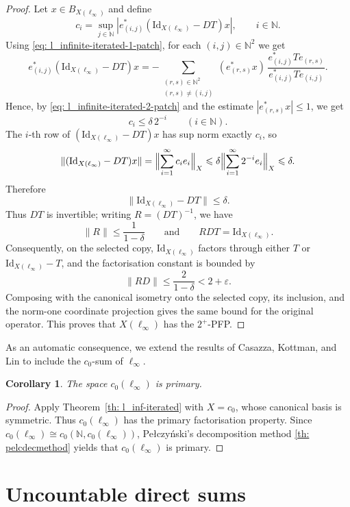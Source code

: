 \documentclass[11pt]{amsart}
\theoremstyle{plain}
\newtheorem{corollary}[theorem]{Corollary}
\theoremstyle{definition}
\numberwithin{equation}{section}
\newcommand{\norm}[1]{\lVert #1 \rVert}
\newcommand{\N}{\mathbb{N}}
\newcommand{\Id}{\mathrm{Id}}
\renewcommand{\le}{\leqslant}
\renewcommand{\leq}{\leqslant}
\begin{document}
\begin{proof}
    Let $x\in B_{X(\ell_\infty)}$ and define
    \[
    c_i=\sup_{j\in\N}|e^*_{(i,j)}(\Id_{X(\ell_\infty)}-DT)x|,
    \qquad i\in\N.
    \]
    Using \eqref{eq: l_infinite-iterated-1-patch}, for each $(i,j)\in\N^2$ we get
    \[
    e^*_{(i,j)}(\Id_{X(\ell_\infty)}-DT)x
    = -\sum_{\substack{(r,s)\in\N^2\\(r,s)\neq(i,j)}}
    (e^*_{(r,s)}x)\,\frac{e^*_{(i,j)}Te_{(r,s)}}{e^*_{(i,j)}Te_{(i,j)}}.
    \]
    Hence, by \eqref{eq: l_infinite-iterated-2-patch} and the estimate
    $|e^*_{(r,s)}x|\le 1$, we get
    \[
    c_i\le \delta\,2^{-i}
    \qquad(i\in\N).
    \]
    The $i$-th row of $(\Id_{X(\ell_\infty)}-DT)x$ has sup norm exactly $c_i$, so
    \[
    \norm{(\Id_{X(\ell_\infty)}-DT)x}
    = \Bigl\|\sum_{i=1}^\infty c_i e_i\Bigr\|_X
    \le \delta
    \Bigl\|\sum_{i=1}^\infty 2^{-i}e_i\Bigr\|_X
    \leq \delta.
    \]
    Therefore
    \[
    \norm{\Id_{X(\ell_\infty)}-DT}\le \delta.
    \]
    Thus $DT$ is invertible; writing $R=(DT)^{-1}$, we have
    \[
    \norm{R}\le \frac{1}{1-\delta}
    \qquad\text{and}\qquad
    RDT=\Id_{X(\ell_\infty)}.
    \]
    Consequently, on the selected copy, $\Id_{X(\ell_\infty)}$ factors through either $T$ or
    $\Id_{X(\ell_\infty)}-T$, and the factorisation constant is bounded by
    \[
    \norm{RD}\le \frac{2}{1-\delta}<2+\varepsilon.
    \]
    Composing with the canonical isometry onto the selected copy, its inclusion, and the norm-one coordinate projection gives the same bound for the original operator. This proves that $X(\ell_\infty)$ has the $2^+$-PFP.
\end{proof}

As an automatic consequence, we extend the results of Casazza, Kottman, and Lin \cite{CKL1976} to include the $c_0$-sum of $\ell_\infty$.

\begin{corollary}
    The space $c_0(\ell_\infty)$ is primary.
\end{corollary}
\begin{proof}
    Apply Theorem~\ref{th: l_inf-iterated} with $X=c_0$, whose canonical basis is symmetric.
    Thus $c_0(\ell_\infty)$ has the primary factorisation property.
    Since $c_0(\ell_\infty)\cong c_0(\N,c_0(\ell_\infty))$, Pe{\l}czy\'nski's decomposition method \ref{th: pelcdecmethod} yields that $c_0(\ell_\infty)$ is primary.
\end{proof}



\section{Uncountable direct sums}\label{sec: uncountable-direct-sums}
\end{document}
